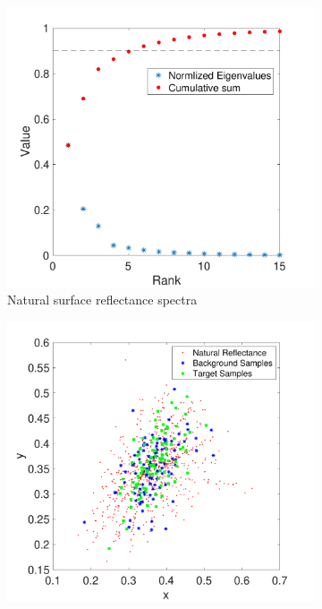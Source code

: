 \documentclass{jov}
\begin{document}
\begin{figure}
    \centering
	\begin{subfigure}[b]{0.3 \textwidth}
    \centering
        \includegraphics[width=\textwidth]{../Figures/Figure7/Figure7_d.pdf}
        \caption{Natural surface reflectance spectra}
        \label{fig:naturalSurfaceTarget}
    \end{subfigure}
    \begin{subfigure}[b]{0.3\textwidth}
    \centering
        \includegraphics[width=\textwidth]{../Figures/Figure7/Figure7_e.pdf}

\end{subfigure}
\end{figure}
\end{document}
